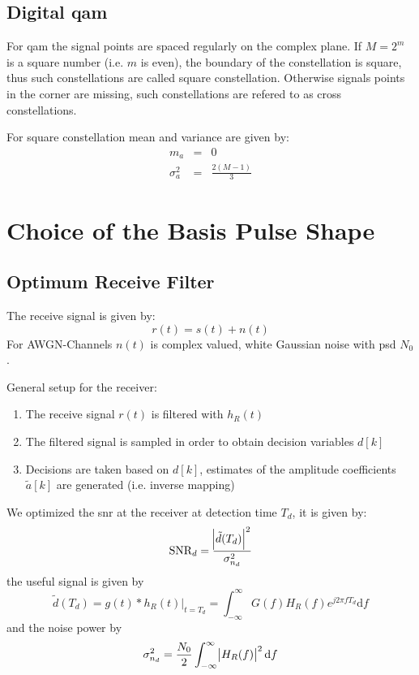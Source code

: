 \subsection{Digital \acl{qam}}
For \ac{qam} the signal points are spaced regularly on the complex plane.
If $M=2^m$ is a square number (i.e. $m$ is even), the boundary of the constellation
is square, thus such constellations are called square constellation. Otherwise
signals points in the corner are missing, such constellations are refered to as cross
constellations.

For square constellation mean and variance are given by:
\begin{eqnarray}
    m_a &=& 0 \\
    \sigma_a^2 &=& \frac{2 (M-1)}{3}
\end{eqnarray}

\section{Choice of the Basis Pulse Shape}
\subsection{Optimum Receive Filter}
The receive signal is given by:
\begin{equation}
    r(t) = s(t) + n(t)
\end{equation}
For AWGN-Channels $n(t)$ is complex valued, white Gaussian noise with \ac{psd} $N_0$.

General setup for the receiver:
\begin{enumerate}
    \item The receive signal $r(t)$ is filtered with $h_R(t)$
    \item The filtered signal is sampled in order to obtain decision variables $d[k]$
    \item Decisions are taken based on $d[k]$, estimates of the amplitude
        coefficients $\tilde{a}[k]$ are generated (i.e. inverse mapping)
\end{enumerate}

We optimized the \ac{snr} at the receiver at detection time $T_d$, it is given by:
\begin{equation}
    \text{SNR}_d = \frac{\abs{\tilde{d}(T_d)}^2}{\sigma_{n_d}^2}
\end{equation}
the useful signal is given by
\begin{equation}
    \tilde{d}(T_d) = g(t) * h_R(t) \vert_{t=T_d} = \int_{-\infty}^\infty G(f) H_R(f)
        e^{j 2 \pi f T_d} \text{d}f
\end{equation}
and the noise power by
\begin{equation}
    \sigma_{n_d}^2 = \frac{N_0}{2} \int_{-\infty}^\infty \abs{H_R(f)}^2 \text{d}f
\end{equation}

